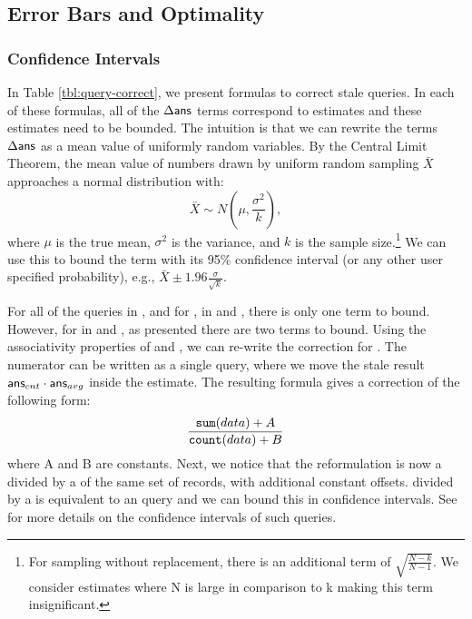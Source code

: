 \subsection{Error Bars and Optimality}\label{subsec:correct-practical}
\subsubsection{Confidence Intervals}
In Table \ref{tbl:query-correct}, we present formulas to correct stale queries.
In each of these formulas, all of the $\Delta\textsf{ans}$ terms correspond to estimates and these estimates need to be bounded.
The intuition is that we can rewrite the terms $\Delta\textsf{ans}$ as a mean value of uniformly random variables.
By the Central Limit Theorem, the mean value of numbers drawn by uniform random sampling $\bar{X}$ approaches a normal distribution with:
\[
\bar{X} \sim N(\mu,\frac{\sigma^2}{k}),
\]
where $\mu$ is the true mean, $\sigma^2$ is the variance, and $k$ is the sample size.\footnote{\scriptsize For sampling without replacement, there is an additional term of $\sqrt{\frac{N-k}{N-1}}$. We consider estimates where N is large in comparison to k making this term insignificant.}
We can use this to bound the term with its 95\% confidence interval (or any other user specified probability), e.g., $\bar{X} \pm 1.96 \frac{\sigma}{\sqrt{k}}$.

For all of the queries in \aggview, and for \sumfunc, \countfunc in \spview and \fjview, there is only one term to bound.
However, for \avgfunc in \spview and \fjview, as presented there are two terms to bound.
Using the associativity properties of \countfunc and \sumfunc, we can re-write the correction for \avgfunc.
The numerator can be written as a single \sumfunc query, where we move the stale result $\textsf{ans}_{cnt}\cdot\textsf{ans}_{avg}$ inside the estimate.
The resulting formula gives a correction of the following form:
\[
\frac{\texttt{sum} (data) + A}{\texttt{count}(data) + B}
\]
where A and B are constants.
Next, we notice that the reformulation is now a \sumfunc divided by a \countfunc of the same set of records, with additional constant offsets.
\sumfunc divided by a \countfunc is equivalent to an \avgfunc query and we can bound this in confidence intervals.
See \cite{wang1999sample} for more details on the confidence intervals of such queries.

